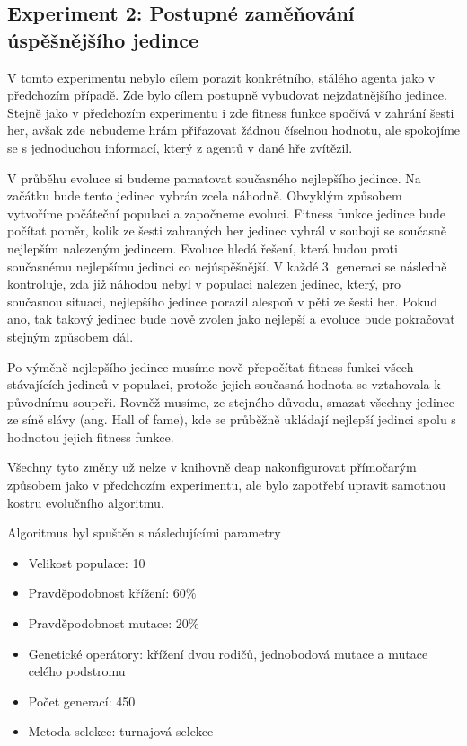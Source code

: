 \subsection{Experiment 2: Postupné zaměňování úspěšnějšího jedince}
V tomto experimentu nebylo cílem porazit konkrétního, stálého agenta jako v předchozím případě.
Zde bylo cílem postupně vybudovat nejzdatnějšího jedince.
Stejně jako v předchozím experimentu i zde fitness funkce spočívá v zahrání šesti her,
avšak zde nebudeme hrám přiřazovat žádnou číselnou hodnotu, ale spokojíme se s jednoduchou informací, který z agentů v dané hře zvítězil.
\par
V průběhu evoluce si budeme pamatovat současného nejlepšího jedince. 
Na začátku bude tento jedinec vybrán zcela náhodně. Obvyklým způsobem vytvoříme počáteční populaci a započneme evoluci.
Fitness funkce jedince bude počítat poměr, kolik ze šesti zahraných her jedinec vyhrál v souboji se současně nejlepším nalezeným jedincem.
Evoluce hledá řešení, která budou proti současnému nejlepšímu jedinci co nejúspěšnější.
V každé 3. generaci se následně kontroluje, zda již náhodou nebyl v populaci nalezen jedinec, který, pro současnou situaci, nejlepšího jedince porazil alespoň v pěti ze šesti her.
Pokud ano, tak takový jedinec bude nově zvolen jako nejlepší a evoluce bude pokračovat stejným způsobem dál.
\par
Po výměně nejlepšího jedince musíme nově přepočítat fitness funkci všech stávajících jedinců v populaci, protože jejich současná hodnota se vztahovala k původnímu soupeři.
Rovněž musíme, ze stejného důvodu, smazat všechny jedince ze síně slávy (ang. Hall of fame), kde se průběžně ukládají nejlepší jedinci spolu s hodnotou jejich fitness funkce.

\par
Všechny tyto změny už nelze v knihovně deap nakonfigurovat přímočarým způsobem jako v předchozím experimentu, ale bylo zapotřebí upravit samotnou kostru evolučního algoritmu.

\par
Algoritmus byl spuštěn s následujícími parametry
\begin{itemize}
    \item Velikost populace: 10
    \item Pravděpodobnost křížení: 60\%
    \item Pravděpodobnost mutace: 20\%
    \item Genetické operátory: křížení dvou rodičů, jednobodová mutace a mutace celého podstromu
    \item Počet generací: 450
    \item Metoda selekce: turnajová selekce
\end{itemize}


